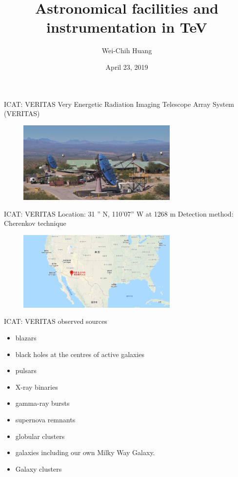 \documentclass{beamer}
\title[TeV Astrophysics]{Astronomical facilities and instrumentation in TeV}
\author{Wei-Chih Huang}
\institute[NTHU]{
National Tsing Hua University \\
\medskip
}
\date{April 23, 2019}
\begin{document}
\begin{frame}{ICAT: VERITAS}
    Very Energetic Radiation Imaging Telescope Array System (VERITAS)
    \begin{figure}[h]
        \includegraphics[width=300px]{VERITAS.jpg}
    \end{figure}
\end{frame}


\begin{frame}{ICAT: VERITAS}
    Location: 31 '' N, 110'07'' W at 1268 m
    \newline
    Detection method:  Cherenkov technique
    \begin{figure}[h]
        \includegraphics[width=300px]{VERITAS_location.png}
    \end{figure}
\end{frame}


\begin{frame}{ICAT: VERITAS}
    observed sources
    \begin{itemize}
        \item blazars
        \item black holes at the centres of active galaxies
        \item pulsars
        \item X-ray binaries
        \item gamma-ray bursts
        \item supernova remnants
        \item globular clusters
        \item galaxies including our own Milky Way Galaxy.
        \item Galaxy clusters
    \end{itemize}
\end{frame}
\end{document}
